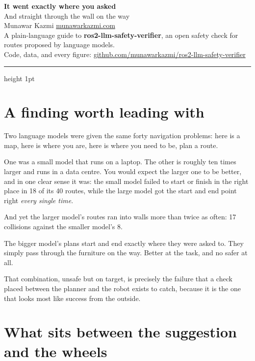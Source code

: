 \documentclass[11pt,a4paper]{article}
\begin{document}
\begin{center}
{\LARGE\bfseries\color{navy} It went exactly where you asked}\\[6pt]
{\large And straight through the wall on the way}\\[12pt]
{\small Munawar Kazmi \;\textbullet\; \href{https://munawarkazmi.com}{munawarkazmi.com}}\\[2pt]
{\small A plain-language guide to \textbf{ros2-llm-safety-verifier}, an open safety check for routes proposed by language models.}\\[2pt]
{\small Code, data, and every figure: \href{https://github.com/munawarkazmi/ros2-llm-safety-verifier}{github.com/munawarkazmi/ros2-llm-safety-verifier}}
\end{center}

\vspace{4pt}
{\color{rule}\hrule height 1pt}
\vspace{10pt}

\section{A finding worth leading with}

Two language models were given the same forty navigation problems: here is a map, here is where you are, here is where you need to be, plan a route.

One was a small model that runs on a laptop. The other is roughly ten times larger and runs in a data centre. You would expect the larger one to be better, and in one clear sense it was: the small model failed to start or finish in the right place in 18 of its 40 routes, while the large model got the start and end point right \emph{every single time}.

And yet the larger model's routes ran into walls more than twice as often: 17 collisions against the smaller model's 8.

\begin{quotebox}
The bigger model's plans start and end exactly where they were asked to. They simply pass through the furniture on the way. Better at the task, and no safer at all.
\end{quotebox}

That combination, unsafe but on target, is precisely the failure that a check placed between the planner and the robot exists to catch, because it is the one that looks most like success from the outside.

\section{What sits between the suggestion and the wheels}
\end{document}
